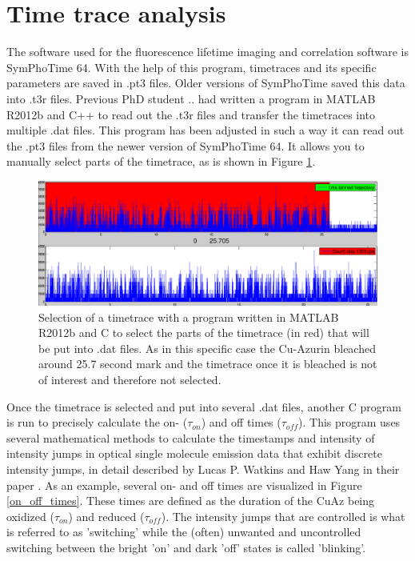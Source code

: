 \documentclass[twoside,single]{lion-msc}
\begin{document}
\section*{Time trace analysis}
The software used for the fluorescence lifetime imaging and correlation software is SymPhoTime 64. With the help of this program, timetraces and its specific parameters are saved in .pt3 files. Older versions of SymPhoTime saved this data into .t3r files. Previous PhD student .. had written a program in MATLAB R2012b and C++ to read out the .t3r files and transfer the timetraces into multiple .dat files. This program has been adjusted in such a way it can read out the .pt3 files from the newer version of SymPhoTime 64. It allows you to manually select parts of the timetrace, as is shown in Figure \ref{timetrace_selection}.

\begin{figure}[ht!]
\centering
\includegraphics[width=\textwidth]{timetrace_selection}
\caption{Selection of a timetrace with a program written in MATLAB R2012b and C to select the parts of the timetrace (in red) that will be put into .dat files. As in this specific case the Cu-Azurin bleached around 25.7 second mark and the timetrace once it is bleached is not of interest and therefore not selected.}
\label{timetrace_selection}
\end{figure}

Once the timetrace is selected and put into several .dat files, another C program is run to precisely calculate the  on- ($\tau_{on}$) and off times ($\tau_{off}$). This program uses several mathematical methods to calculate the timestamps and intensity of intensity jumps in optical single molecule emission data that exhibit discrete intensity jumps, in detail described by Lucas P. Watkins and Haw Yang in their paper \cite{And2004}. As an example, several on- and off times are visualized in Figure \ref{on_off_times}. These times are defined as the duration of the CuAz being oxidized ($\tau_{on}$) and reduced ($\tau_{off}$). The intensity jumps that are controlled is what is referred to as 'switching' while the (often) unwanted and uncontrolled switching between the bright 'on' and dark 'off' states is called 'blinking'. 
\end{document}
